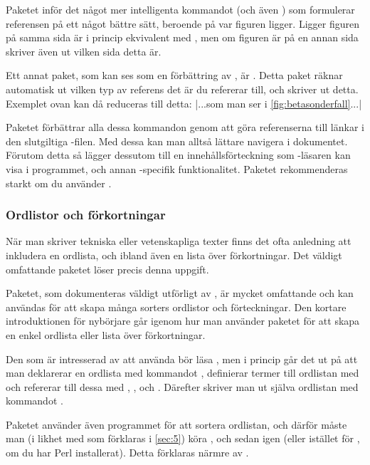 \documentclass[lang=sv,ptsize=10pt,font=none,nomath,titles=bf,../../a4.tex]{subfiles}
\begin{document}
Paketet  inför det något mer intelligenta kommandot
 (och även ) som formulerar referensen på ett
något bättre sätt, beroende på var figuren ligger. Ligger figuren på samma
sida är  i princip ekvivalent med , men om figuren är
på en annan sida skriver  även ut vilken sida detta är.

Ett annat paket, som kan ses som en förbättring av , är
. Detta paket räknar automatisk ut vilken typ av referens
det är du refererar till, och skriver ut detta. Exemplet ovan kan då
reduceras till detta:
\latex|...som man ser i \cref{fig:betasonderfall}...|

Paketet  förbättrar alla dessa kommandon genom att
göra referenserna till länkar i den slutgiltiga \PDF-filen. Med dessa kan
man alltså lättare navigera i dokumentet. Förutom detta så lägger
 dessutom till en innehållsförteckning som \PDF-läsaren
kan visa i programmet, och annan \PDF-specifik funktionalitet. Paketet
rekommenderas starkt om du använder \pdfLaTeX.

\subsubsection{Ordlistor och förkortningar}\label{sec:2:glossaries}
När man skriver tekniska eller vetenskapliga texter finns det ofta
anledning att inkludera en ordlista, och ibland även en lista över
förkortningar. Det väldigt omfattande paketet 
löser precis denna uppgift.

Paketet, som dokumenteras väldigt utförligt av \textcite{Talbot13a},
är mycket omfattande och kan användas för att skapa många sorters
ordlistor och förteckningar. Den kortare introduktionen för nybörjare
\parencite{Talbot13b} går igenom hur man använder paketet för att skapa
en enkel ordlista eller lista över förkortningar.

Den som är intresserad av att använda  bör läsa 
\textcite{Talbot13b}, men i princip går det ut på att man deklarerar en
ordlista med kommandot , definierar termer till
ordlistan med  och refererar till dessa med
, ,  och . Därefter skriver man
ut själva ordlistan med kommandot .

Paketet använder även programmet  för att sortera ordlistan,
och därför måste man (i likhet med  som förklaras i
\cref{sec:5}) köra ,  och sedan 
igen (eller  istället för , om du har
Perl installerat). Detta förklaras närmre av
\textcite{Talbot13a,Talbot13b}.
\end{document}
